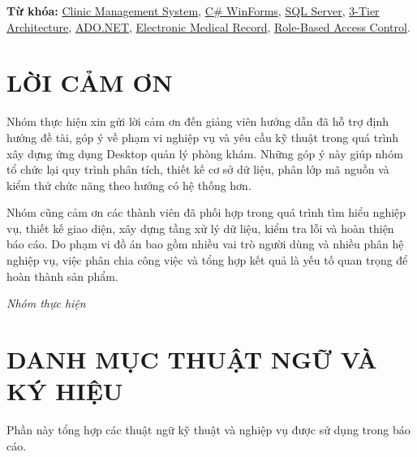 \documentclass[12pt,a4paper]{article}
\numberwithin{figure}{subsection}
\numberwithin{table}{subsection}
\begin{document}
\noindent\textbf{Từ khóa:}
\href{https://www.google.com/search?q=Clinic+Management+System}{Clinic Management System},
\href{https://www.google.com/search?q=Windows+Forms+C%23}{C\# WinForms},
\href{https://www.google.com/search?q=SQL+Server}{SQL Server},
\href{https://www.google.com/search?q=3-tier+architecture}{3-Tier Architecture},
\href{https://www.google.com/search?q=ADO.NET}{ADO.NET},
\href{https://www.google.com/search?q=Electronic+Medical+Record}{Electronic Medical Record},
\href{https://www.google.com/search?q=role-based+access+control}{Role-Based Access Control}.

\vspace{1.2cm}
\newpage
\section*{LỜI CẢM ƠN}
{}

Nhóm thực hiện xin gửi lời cảm ơn đến giảng viên hướng dẫn đã hỗ trợ định hướng đề tài, góp ý về phạm vi nghiệp vụ và yêu cầu kỹ thuật trong quá trình xây dựng ứng dụng Desktop quản lý phòng khám. Những góp ý này giúp nhóm tổ chức lại quy trình phân tích, thiết kế cơ sở dữ liệu, phân lớp mã nguồn và kiểm thử chức năng theo hướng có hệ thống hơn.

Nhóm cũng cảm ơn các thành viên đã phối hợp trong quá trình tìm hiểu nghiệp vụ, thiết kế giao diện, xây dựng tầng xử lý dữ liệu, kiểm tra lỗi và hoàn thiện báo cáo. Do phạm vi đồ án bao gồm nhiều vai trò người dùng và nhiều phân hệ nghiệp vụ, việc phân chia công việc và tổng hợp kết quả là yếu tố quan trọng để hoàn thành sản phẩm.

\begin{flushright}
\textit{Nhóm thực hiện}
\end{flushright}

\newpage
\thispagestyle{empty}
\section*{DANH MỤC THUẬT NGỮ VÀ KÝ HIỆU}
{}

Phần này tổng hợp các thuật ngữ kỹ thuật và nghiệp vụ được sử dụng trong báo cáo.
\end{document}
